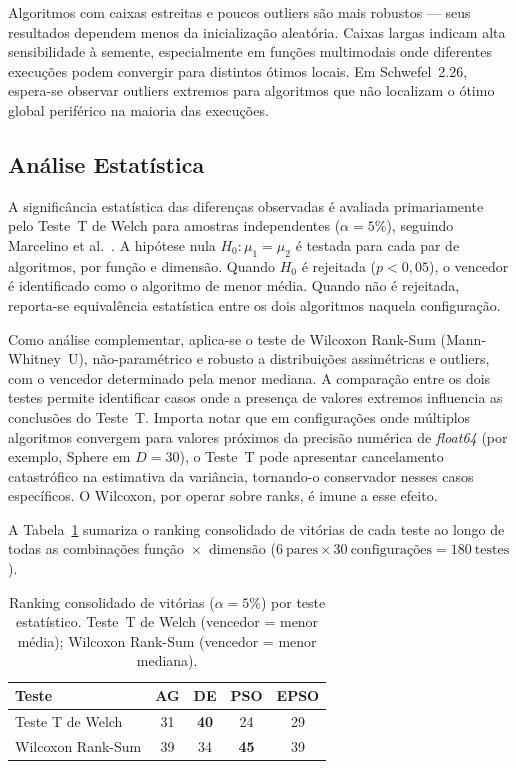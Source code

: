 \documentclass[runningheads]{llncs}
\begin{document}
Algoritmos com caixas estreitas e poucos outliers são mais robustos —
seus resultados dependem menos da inicialização aleatória. Caixas
largas indicam alta sensibilidade à semente, especialmente em funções
multimodais onde diferentes execuções podem convergir para distintos
ótimos locais. Em Schwefel~2.26, espera-se observar outliers extremos
para algoritmos que não localizam o ótimo global periférico na maioria
das execuções.

\subsection{An\'{a}lise Estat\'{i}stica}

A significância estatística das diferenças observadas é avaliada
primariamente pelo Teste~T de Welch para amostras independentes
($\alpha = 5\%$), seguindo Marcelino et al.~\cite{marcelino2018}.
A hipótese nula $H_0\!: \mu_1 = \mu_2$ é testada para cada par de
algoritmos, por função e dimensão. Quando $H_0$ é rejeitada
($p < 0{,}05$), o vencedor é identificado como o algoritmo de menor
média. Quando não é rejeitada, reporta-se equivalência estatística
entre os dois algoritmos naquela configuração.

Como análise complementar, aplica-se o teste de Wilcoxon
Rank-Sum (Mann-Whitney~U), não-paramétrico e robusto a distribuições
assimétricas e outliers, com o vencedor determinado pela menor
mediana. A comparação entre os dois testes permite identificar casos
onde a presença de valores extremos influencia as conclusões do
Teste~T\@. Importa notar que em configurações onde múltiplos
algoritmos convergem para valores próximos da precisão numérica de
\textit{float64} (por exemplo, Sphere em $D=30$), o Teste~T pode
apresentar cancelamento catastrófico na estimativa da variância,
tornando-o conservador nesses casos específicos. O Wilcoxon, por
operar sobre ranks, é imune a esse efeito.

A Tabela~\ref{tab:ranking_t} sumariza o ranking consolidado de
vitórias de cada teste ao longo de todas as combinações
função~$\times$~dimensão
($6\ \text{pares} \times 30\ \text{configurações} = 180\ \text{testes}$).

\begin{table}[H]
\caption{Ranking consolidado de vitórias ($\alpha = 5\%$) por teste
estatístico. Teste~T de Welch (vencedor = menor média);
Wilcoxon Rank-Sum (vencedor = menor mediana).}
\label{tab:ranking_t}
\centering
\begin{tabular}{lcccc}
\toprule
\textbf{Teste} & \textbf{AG} & \textbf{DE} & \textbf{PSO} & \textbf{EPSO} \\
\midrule
Teste T de Welch  & 31 & \textbf{40} & 24 & 29 \\
Wilcoxon Rank-Sum & 39 & 34 & \textbf{45} & 39 \\
\bottomrule
\end{tabular}
\end{table}
\end{document}
